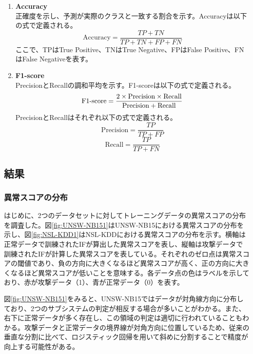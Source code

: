 \documentclass{css}
\begin{document}
\begin{enumerate}
    \item \textbf{Accuracy}\\
        正確度を示し、予測が実際のクラスと一致する割合を示す。Accuracyは以下の式で定義される。
        \begin{equation}
            \mathrm{Accuracy} = \frac{TP + TN}{TP + TN + FP + FN}
        \end{equation}
        ここで、TPはTrue Positive、TNはTrue Negative、FPはFalse Positive、FNはFalse Negativeを表す。
    
    \item \textbf{F1-score}\\
        PrecisionとRecallの調和平均を示す。F1-scoreは以下の式で定義される。
        \begin{equation}
            \mathrm{F1\mathchar`-score} = \frac{2 \times \mathrm{Precision} \times \mathrm{Recall}}{\mathrm{Precision} + \mathrm{Recall}}
        \end{equation}
        PrecisionとRecallはそれぞれ以下の式で定義される。
        \begin{equation}
            \mathrm{Precision} = \frac{TP}{TP + FP}
        \end{equation}
        \begin{equation}
            \mathrm{Recall} = \frac{TP}{TP + FN}
        \end{equation}
\end{enumerate}

\subsection{結果}

\subsubsection{異常スコアの分布}
はじめに、2つのデータセットに対してトレーニングデータの異常スコアの分布を調査した。図\ref{fig:UNSW-NB151}はUNSW-NB15における異常スコアの分布を示し、図\ref{fig:NSL-KDD1}はNSL-KDDにおける異常スコアの分布を示す。横軸は正常データで訓練されたIFが算出した異常スコアを表し、縦軸は攻撃データで訓練されたIFが計算した異常スコアを表している。それぞれのゼロ点は異常スコアの閾値であり、負の方向に大きくなるほど異常スコアが高く、正の方向に大きくなるほど異常スコアが低いことを意味する。各データ点の色はラベルを示しており、赤が攻撃データ（1）、青が正常データ（0）を表す。

図\ref{fig:UNSW-NB151}をみると、UNSW-NB15ではデータが対角線方向に分布しており、2つのサブシステムの判定が相反する場合が多いことがわかる。また、右下に正常データが多く存在し、この領域の判定は適切に行われていることもわかる。攻撃データと正常データの境界線が対角方向に位置しているため、従来の垂直な分割に比べて、ロジスティック回帰を用いて斜めに分割することで精度が向上する可能性がある。
\end{document}

